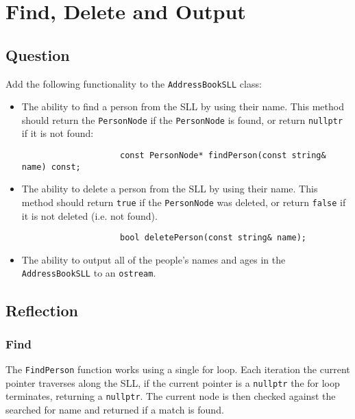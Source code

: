 \section{Find, Delete and Output}
    \subsection*{Question}
        Add the following functionality to the \texttt{AddressBookSLL}
        class:\\

        \begin{itemize}
            \item The ability to find a person from the SLL by using their name.
                This method should return the \texttt{PersonNode} 
                if the \texttt{PersonNode} is found,
                or return \texttt{nullptr} if it is not found:\\
                \begin{verbatim}
                    const PersonNode* findPerson(const string& name) const;
                \end{verbatim}

            \item The ability to delete a person from the SLL by using their name.
                This method should return \texttt{true} 
                if the \texttt{PersonNode} was deleted,
                or return \texttt{false} if it is not deleted (i.e. not found).
                \begin{verbatim}
                    bool deletePerson(const string& name);
                \end{verbatim}

            \item The ability to output all of the people’s names and ages 
                in the \texttt{AddressBookSLL} to an \texttt{ostream}.
        \end{itemize}

    \subsection*{Reflection}
        \subsubsection*{Find}
            The \texttt{FindPerson} function works using a single for loop.
            Each iteration the current pointer traverses along the SLL,
            if the current pointer is a \texttt{nullptr} the for loop terminates,
            returning a \texttt{nullptr}.
            The current node is then checked against the searched for name and returned if a match is found.

